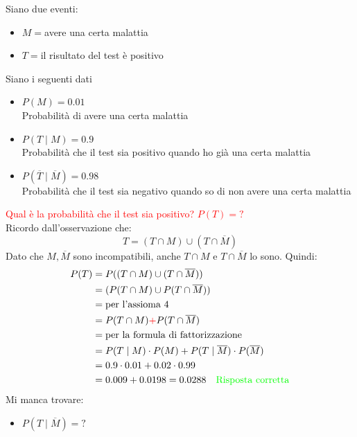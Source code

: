 \documentclass{article}  %
\theoremstyle{definition}
\begin{document}
\begin{esercizio}[Esercizio 1]
	Siano due eventi:
	\begin{itemize}
		\item $M=$avere una certa malattia
		\item $T=$il risultato del test è positivo
	\end{itemize}
	Siano i seguenti dati
	\begin{itemize}
		\item $P(M)=0.01$ \\
		      Probabilità di avere una certa malattia
		\item $P(T \mid M)=0.9$ \\
		      Probabilità che il test sia positivo quando ho già una certa malattia
		\item $P(\overline{T} \mid \overline{M})=0.98$ \\
		      Probabilità che il test sia negativo quando so di non avere una certa malattia
	\end{itemize}
	\textcolor{red}{Qual è la probabilità che il test sia positivo? $P(T)=?$} \\
	Ricordo dall'osservazione che:
	\[
		T=(T \cap M)\cup(T \cap \overline{M})
	\]
	Dato che $M, \overline{M}$ sono incompatibili, anche $T \cap M$ e $T \cap \overline{M}$ lo sono.
	Quindi:
	\begin{align*}
		P(T)
		 & = P((T \cap M) \cup (T \cap \overline{M}))                                 \\
		 & = (P(T \cap M) \cup P(T \cap \overline{M}))                                \\
		 & =\text{per l'assioma 4}                                                    \\
		 & =P(T \cap M) \textcolor{red}{+} P(T \cap \overline{M})                     \\
		 & = \text{per la formula di fattorizzazione}                                 \\
		 & = P(T \mid M) \cdot P(M) + P(T \mid \overline{M}) \cdot P(\overline{M})    \\
		 & = 0.9 \cdot 0.01 + 0.02 \cdot 0.99                                         \\
		 & =0.009 + 0.0198 = 0.0288 \quad \textcolor{green}{\text{Risposta corretta}}
	\end{align*}
	Mi manca trovare:
	\begin{itemize}
		\item $P(T \mid \overline{M})=?$ \\

\end{itemize}
\end{esercizio}
\end{document}
